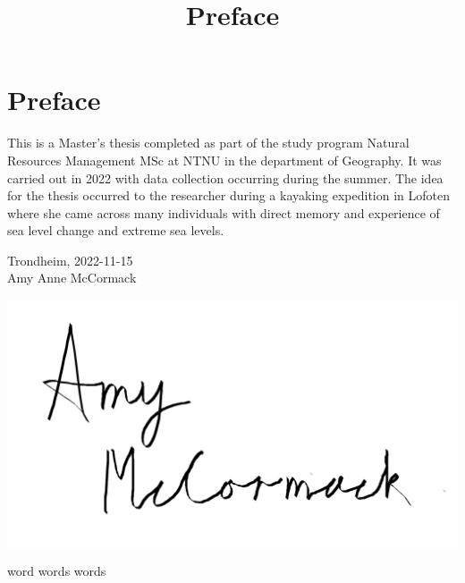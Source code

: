 \documentclass{article}
\begin{document}

\section{Preface}


\title{Preface}
This is a Master's thesis completed as part of the study program Natural Resources Management MSc at NTNU in the department of Geography. It was carried out in 2022 with data collection occurring during the summer. The idea for the thesis occurred to the researcher during a kayaking expedition in Lofoten where she came across many individuals with direct memory and experience of sea level change and extreme sea levels. \\[2cm]

\begin{center}
Trondheim, 2022-11-15\\[1pc]


Amy Anne McCormack 
\end{center}



\graphicspath{ {./images/} }
\includegraphics[scale=0.5]{fig/to use signature png}
\newpage

\tableofcontents

\renewcommand{\listfigurename}{List of Figures}
\renewcommand{\listtablename}{List of Tables}

\listoffigures
\listoftables
\clearpage
{}



word words words
\end{document}
